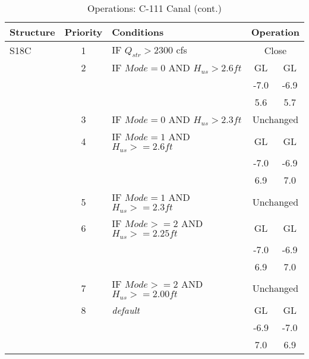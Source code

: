 \clearpage


\scriptsize
\begin{table}[!h]
\centering
\caption{Operations: C-111 Canal (cont.)}
\label{tab:M11opsC111c}
\begin{tabular}{|l|c|l|c|c|}
\hline
\textbf{Structure} & \textbf{Priority}  & \textbf{Conditions} & \multicolumn{2}{|c|}{\textbf{Operation}}   \\
\hline
\hline
S18C          &  1  & IF $Q_{str}>2300$ cfs                  & \multicolumn{2}{|c|}{Close}   \\
\hline
              &  2  & IF $Mode=0$  AND $H_{us}>2.6ft$        & GL    & GL   \\
              &     &                                        & -7.0  & -6.9 \\
              &     &                                        & 5.6   & 5.7  \\
\hline
              &  3  & IF $Mode=0$ AND $H_{us}>2.3ft$         & \multicolumn{2}{|c|}{Unchanged}   \\
\hline
              &  4  & IF $Mode=1$  AND $H_{us}>=2.6ft$       & GL    & GL   \\
              &     &                                        & -7.0  & -6.9 \\
              &     &                                        & 6.9   & 7.0  \\
\hline
              &  5  & IF $Mode=1$ AND $H_{us}>=2.3ft$        & \multicolumn{2}{|c|}{Unchanged}   \\
\hline
              &  6  & IF $Mode>=2$ AND $H_{us}>=2.25ft$      & GL    & GL   \\
              &     &                                        & -7.0  & -6.9 \\
              &     &                                        & 6.9   & 7.0  \\
\hline
              &  7  & IF $Mode>=2$ AND $H_{us}>=2.00ft$      & \multicolumn{2}{|c|}{Unchanged}   \\
\hline
              &  8  & \it{default}                           & GL    & GL    \\
              &     &                                        & -6.9  & -7.0 \\
              &     &                                        & 7.0   & 6.9  \\
\hline
\hline
\end{tabular}
\end{table}
\normalsize

